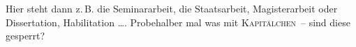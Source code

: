 \documentclass[%
  paper=A4, %
  pagesize, %
  DIV=calc, %
  BCOR=1cm, %
  smallheadings,%
  ngerman   %
]{scrbook}  %
\begin{document}
Hier steht dann z.\,B. die Seminararbeit, die Staatsarbeit,
Magisterarbeit oder Dissertation, Habilitation \dots. Probehalber mal was
mit \textsc{Kapitälchen}~-- sind diese gesperrt?
\end{document}
